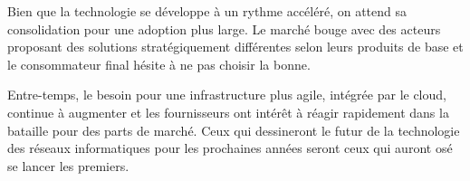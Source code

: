 Bien que la technologie se développe à un rythme accéléré, on attend sa consolidation pour une adoption plus large. Le marché bouge avec des acteurs proposant des solutions stratégiquement différentes selon leurs produits de base et le consommateur final hésite à ne pas choisir la bonne.

Entre-temps, le besoin pour une infrastructure plus agile, intégrée par le cloud, continue à augmenter et les fournisseurs ont intérêt à réagir rapidement dans la bataille pour des parts de marché. Ceux qui dessineront le futur de la technologie des réseaux informatiques pour les prochaines années seront ceux qui auront osé se lancer les premiers.

